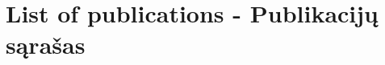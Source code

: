 \chapter*{List of publications - Publikacijų sąrašas}
\label{cha:publications} 

	
%



\makeatletter
\newcommand{\authorpaperlabel}[2]{%
    \@bsphack
    \begingroup
        \def\label@name{#1}%
        \label@hook
        \protected@write\@auxout{}{
            \string\newlabel{#1}{%
                {#2} %
                {\thepage} %
                {\@currentlabelname}%
                {\@currentHref}%
                {}%
            } %
        }%
    \endgroup
    \@esphack
}%
\makeatother
  
\newenvironment{publicationlist}[1]{%
\setcounter{itemnumber}{0}%
\begin{list}{\textbf{#1}}{}%
}{\end{list}}

